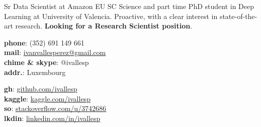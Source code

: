 \documentclass{resume} %
\begin{document}
\noindent

\printname

\begin{minipage}[t]{.38\textwidth}
	\raggedright


Sr Data Scientist at Amazon EU SC Science and part time PhD student in Deep Learning at University of Valencia. Proactive, with a clear interest in state-of-the-art research. \textbf{Looking for a Research Scientist position}.
\end{minipage}\hspace{.05\textwidth}
\begin{minipage}[t]{.27\textwidth}
	\raggedright
	{\textbf{phone}: (352) 691 149 661 \\
	\textbf{mail}: \href{mailto:ivanvallesperez@gmail.com}{ivanvallesperez@gmail.com}\\
	\textbf{chime \& skype}: @ivallesp \\
	\textbf{addr.}: Luxembourg
}
\end{minipage}\hspace{.03\textwidth}
\begin{minipage}[t]{.27\textwidth}
	\raggedright
	{ \textbf{gh}: \href{https://www.github.com/ivallesp}{github.com/ivallesp}  \\
	  \textbf{kaggle}: \href{https://www.kaggle.com/ivallesp}{kaggle.com/ivallesp}  \\
	  \textbf{so}: \href{https://stackoverflow.com/users/3742686/ivallesp}{stackoverflow.com/u/3742686} \\
	  \textbf{lkdin}: \href{https://www.linkedin.com/in/ivallesp}{linkedin.com/in/ivallesp}
	}
\end{minipage}


\end{document}
